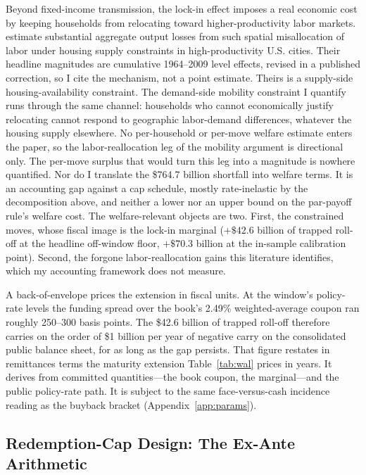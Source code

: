 \documentclass[12pt]{article}
\begin{document}
Beyond fixed-income transmission, the lock-in effect imposes a real economic cost by keeping households from relocating toward higher-productivity labor markets. \citet{hsieh2019} estimate substantial aggregate output losses from such spatial misallocation of labor under housing supply constraints in high-productivity U.S. cities. Their headline magnitudes are cumulative 1964--2009 level effects, revised in a published correction, so I cite the mechanism, not a point estimate. Theirs is a supply-side housing-availability constraint. The demand-side mobility constraint I quantify runs through the same channel: households who cannot economically justify relocating cannot respond to geographic labor-demand differences, whatever the housing supply elsewhere. No per-household or per-move welfare estimate enters the paper, so the labor-reallocation leg of the mobility argument is directional only. The per-move surplus that would turn this leg into a magnitude is nowhere quantified. Nor do I translate the \$764.7 billion shortfall into welfare terms. It is an accounting gap against a cap schedule, mostly rate-inelastic by the decomposition above, and neither a lower nor an upper bound on the par-payoff rule's welfare cost. The welfare-relevant objects are two. First, the constrained moves, whose fiscal image is the lock-in marginal ($+\$42.6$ billion of trapped roll-off at the headline off-window floor, $+\$70.3$ billion at the in-sample calibration point). Second, the forgone labor-reallocation gains this literature identifies, which my accounting framework does not measure.

A back-of-envelope prices the extension in fiscal units. At the window's policy-rate levels the funding spread over the book's 2.49\% weighted-average coupon ran roughly 250--300 basis points. The \$42.6 billion of trapped roll-off therefore carries on the order of \$1 billion per year of negative carry on the consolidated public balance sheet, for as long as the gap persists. That figure restates in remittances terms the maturity extension Table~\ref{tab:wal} prices in years. It derives from committed quantities---the book coupon, the marginal---and the public policy-rate path. It is subject to the same face-versus-cash incidence reading as the buyback bracket (Appendix~\ref{app:params}).

\subsection{Redemption-Cap Design: The Ex-Ante Arithmetic}\label{sec:discussion-capdesign}
\end{document}
